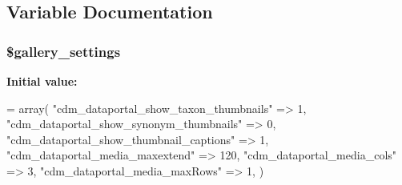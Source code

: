 \subsection{Variable Documentation}
\hypertarget{settings_8php_a9ad94685f3b5334065542770433d4ca7}{
\subsubsection[{\$gallery\-\_\-settings}]{\setlength{\rightskip}{0pt plus 5cm}\$gallery\-\_\-settings}}\label{settings_8php_a9ad94685f3b5334065542770433d4ca7}
{\bfseries Initial value\-:}
\begin{DoxyCode}
= array(
  \textcolor{stringliteral}{"cdm\_dataportal\_show\_taxon\_thumbnails"} => 1,
  \textcolor{stringliteral}{"cdm\_dataportal\_show\_synonym\_thumbnails"} => 0,
  \textcolor{stringliteral}{"cdm\_dataportal\_show\_thumbnail\_captions"} => 1,
  \textcolor{stringliteral}{"cdm\_dataportal\_media\_maxextend"} => 120,
  \textcolor{stringliteral}{"cdm\_dataportal\_media\_cols"} => 3,
  \textcolor{stringliteral}{"cdm\_dataportal\_media\_maxRows"} => 1,
)
\end{DoxyCode}
